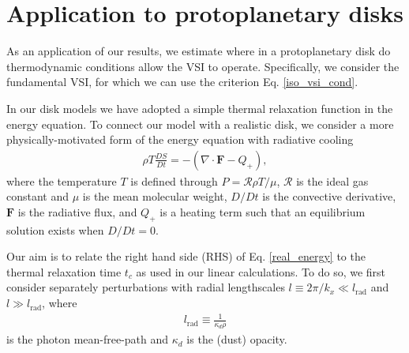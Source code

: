 \section{Application to protoplanetary disks}\label{application} 
As an application of our results, we estimate where in a 
protoplanetary disk do thermodynamic conditions allow the VSI to 
operate. Specifically, we consider the fundamental VSI, 
for which we can use the criterion Eq. \ref{iso_vsi_cond}.   

In our disk models we have adopted a simple thermal relaxation 
function in the energy equation. To connect our model with a realistic
disk, we consider a more physically-motivated form of the energy
equation with radiative cooling 
\begin{align}\label{real_energy}
\rho T \frac{DS}{Dt} = - \left(\nabla\cdot\bm{F} - Q_+\right), 
\end{align}
where the temperature $T$ is defined through $P=\mathcal{R}\rho
T/\mu$, $\mathcal{R}$ is the ideal gas constant and $\mu$ is
the mean molecular weight, %
$D/Dt$ is the convective
derivative, $\bm{F}$ is the radiative flux, and $Q_+$ is a heating
term such that an equilibrium solution exists when $D/Dt=0$. 

Our aim is to relate the right hand side (RHS) of Eq. \ref{real_energy} to
the thermal relaxation time $t_c$ as used in our linear
calculations. To do so, we first consider separately perturbations
with radial lengthscales $l\equiv 2\pi/k_x\ll l_\mathrm{rad}$ and 
$l\gg l_\mathrm{rad}$, where      
\begin{align}\label{lrad}
  l_\mathrm{rad} \equiv \frac{1}{\kappa_d\rho} 
\end{align} 
is the photon mean-free-path and $\kappa_d$ is the (dust) opacity. 

